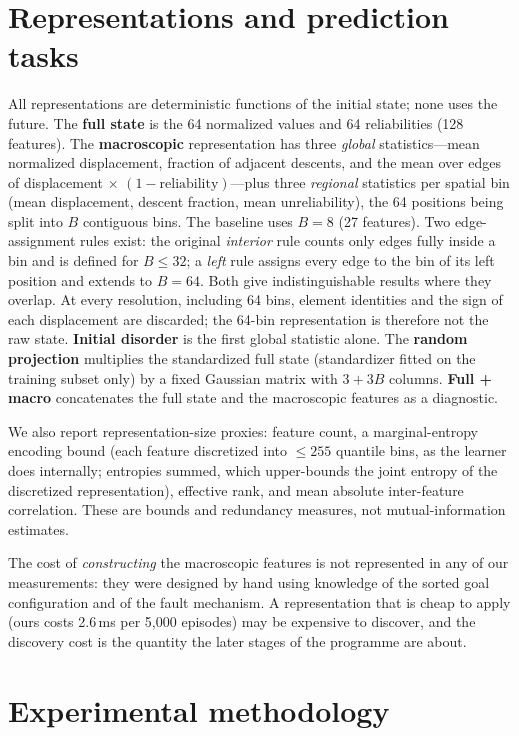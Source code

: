 \documentclass[11pt,a4paper]{article}
\begin{document}
\section{Representations and prediction tasks}

All representations are deterministic functions of the initial state; none uses
the future. The \textbf{full state} is the 64 normalized values and 64
reliabilities (128 features). The \textbf{macroscopic} representation has three
\emph{global} statistics---mean normalized displacement, fraction of adjacent
descents, and the mean over edges of displacement $\times$ $(1-\text{reliability})$---plus
three \emph{regional} statistics per spatial bin (mean displacement, descent
fraction, mean unreliability), the 64 positions being split into $B$ contiguous
bins. The baseline uses $B=8$ (27 features). Two edge-assignment rules exist:
the original \emph{interior} rule counts only edges fully inside a bin and is
defined for $B\le 32$; a \emph{left} rule assigns every edge to the bin of its
left position and extends to $B=64$. Both give indistinguishable results where
they overlap. At every resolution, including 64 bins, element identities and
the sign of each displacement are discarded; the 64-bin representation is
therefore not the raw state. \textbf{Initial disorder} is the first global
statistic alone. The \textbf{random projection} multiplies the standardized full
state (standardizer fitted on the training subset only) by a fixed Gaussian
matrix with $3+3B$ columns. \textbf{Full + macro} concatenates the full state
and the macroscopic features as a diagnostic.

We also report representation-size proxies: feature count, a marginal-entropy
encoding bound (each feature discretized into $\le 255$ quantile bins, as the
learner does internally; entropies summed, which upper-bounds the joint entropy
of the discretized representation), effective rank, and mean absolute
inter-feature correlation. These are bounds and redundancy measures, not
mutual-information estimates.

The cost of \emph{constructing} the macroscopic features is not represented in
any of our measurements: they were designed by hand using knowledge of the
sorted goal configuration and of the fault mechanism. A representation that is
cheap to apply (ours costs 2.6\,ms per 5,000 episodes) may be expensive to
discover, and the discovery cost is the quantity the later stages of the
programme are about.

\section{Experimental methodology}
\end{document}
